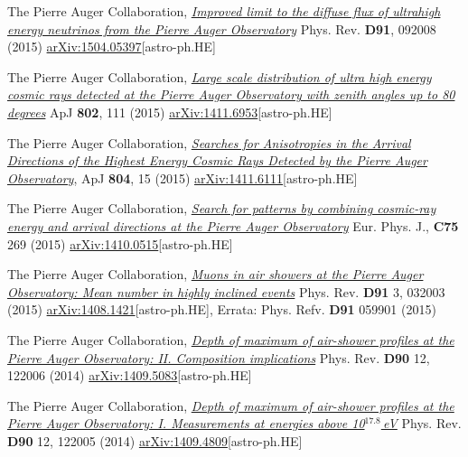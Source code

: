 \begin{etaremune}
\item {}The Pierre Auger Collaboration, \href{http://dx.doi.org/10.1103/PhysRevD.91.092008}{\emph{Improved limit to the diffuse flux of ultrahigh energy neutrinos from the Pierre Auger Observatory}} Phys. Rev. {\bf{D91}}, 092008 (2015) \href{http://arxiv.org/abs/1504.05397}{arXiv:1504.05397}[astro-ph.HE]

\item {}The Pierre Auger Collaboration, \href{http://dx.doi.org/}{\emph{Large scale distribution of ultra high energy cosmic rays detected at the Pierre Auger Observatory with zenith angles up to 80 degrees}} ApJ {\bf{802}}, 111 (2015) \href{http://arxiv.org/abs/1411.6953}{arXiv:1411.6953}[astro-ph.HE]

\item {}The Pierre Auger Collaboration, \href{http://dx.doi.org/}{\emph{Searches for Anisotropies in the Arrival Directions of the Highest Energy Cosmic Rays Detected by the Pierre Auger Observatory}}, ApJ {\bf{804}}, 15 (2015) \href{http://arxiv.org/abs/1411.6111}{arXiv:1411.6111}[astro-ph.HE]

\item {}The Pierre Auger Collaboration, \href{http://dx.doi.org/}{\emph{Search for patterns by combining cosmic-ray energy and arrival directions at the Pierre Auger Observatory}} Eur. Phys. J., {\bf{C75}} 269 (2015) \href{http://arxiv.org/abs/1410.0515}{arXiv:1410.0515}[astro-ph.HE]

\item {}The Pierre Auger Collaboration, \href{http://dx.doi.org/10.1103/PhysRevD.91.032003}{\emph{Muons in air showers at the Pierre Auger Observatory: Mean number in highly inclined events}} Phys. Rev. {\bf{D91}} 3, 032003 (2015) \href{http://arxiv.org/abs/1408.1421}{arXiv:1408.1421}[astro-ph.HE], Errata: Phys. Refv. {\bf{D91}} 059901 (2015)

\item {}The Pierre Auger Collaboration, \href{http://dx.doi.org/10.1103/PhysRevD.90.122006}{\emph{Depth of maximum of air-shower profiles at the Pierre Auger Observatory: II. Composition implications}} Phys. Rev. {\bf{D90}} 12, 122006 (2014) \href{http://arxiv.org/abs/1409.5083}{arXiv:1409.5083}[astro-ph.HE]

\item {}The Pierre Auger Collaboration, \href{http://dx.doi.org/10.1103/PhysRevD.90.122005}{\emph{Depth of maximum of air-shower profiles at the Pierre Auger Observatory: I. Measurements at energies above 10$^{17.8}$\,eV}} Phys. Rev. {\bf{D90}} 12, 122005 (2014) \href{http://arxiv.org/abs/1409.4809}{arXiv:1409.4809}[astro-ph.HE]


\end{etaremune}
